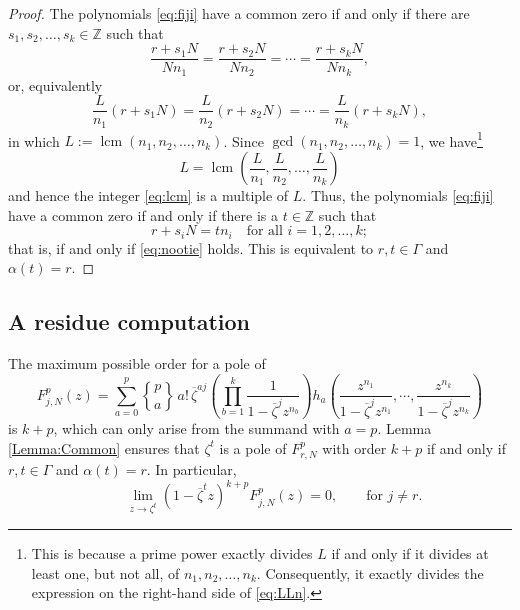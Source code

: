 \documentclass[10pt,reqno]{amsart}
\newcommand{\ZZ}{\mathbb{Z}}
\newcommand{\lcm}{\operatorname{lcm}}
\newcommand{\0}{\color{lightgray}0}
\newcommand{\stirling}[2]{\genfrac\{\}{0pt}{}{#1}{#2}}
\renewcommand\>{\rangle}
\newcommand\<{\langle}
\theoremstyle{plain}
\theoremstyle{definition}
\begin{document}
\begin{proof}
    The polynomials \eqref{eq:fiji} have a common zero if and only if there are $s_1,s_2,\ldots,s_k \in \ZZ$ such that 
    \begin{equation*}
        \frac{r+s_1N}{Nn_1} = \frac{r+s_2N}{Nn_2} = \cdots = \frac{r+s_kN}{Nn_k},
    \end{equation*}
    or, equivalently
    \begin{equation}\label{eq:lcm}
        \frac{L}{n_1}(r+s_1N) = \frac{L}{n_2}(r+s_2N) = \cdots = \frac{L}{n_k}(r+s_kN),
    \end{equation}
    in which $L:=\lcm(n_1,n_2,\ldots,n_k)$.  
    Since $\gcd(n_1,n_2,\ldots,n_k)=1$, we have\footnote{This is because a prime power exactly divides $L$ if and only if it divides at least one, but not all, of $n_1,n_2,\ldots,n_k$.
    Consequently, it exactly divides the expression on the right-hand side of \eqref{eq:LLn}.}%
    \begin{equation}\label{eq:LLn}
        L=\lcm \left( \frac{L}{n_1}, \frac{L}{n_2},\ldots,\frac{L}{n_k} \right)
    \end{equation}
    and hence the integer \eqref{eq:lcm} is a multiple of $L$.  Thus,
    the polynomials \eqref{eq:fiji} have a common zero if and only if
    there is a $t \in \ZZ$ such that 
    \begin{equation}\label{eq:eqn}
        r+s_iN=tn_i \quad \text{for all $i=1,2,\ldots,k$};
    \end{equation} 
    that is, if and only if \eqref{eq:nootie} holds.
    This is equivalent to $r,t \in \Gamma$ and $\alpha(t)=r$.
\end{proof}








\subsection{A residue computation}
The maximum possible order for a pole of 
\begin{equation*}
F^p_{j,N}(z) =
\sum_{a=0}^p \stirling{p}{a} \, a! \,\overline{\zeta}^{aj}
\left( \prod_{b=1}^k \frac{1}{1 - \overline{\zeta}^j z^{n_b}}  \right) h_a \left( \frac{z^{n_1}}{1 - \overline{\zeta}^j z^{n_1}}, \cdots, \frac{z^{n_k}}{1 - \overline{\zeta}^j z^{n_k}} \right)
\end{equation*}
is $k+p$, which can only arise from the summand with $a = p$.
Lemma \ref{Lemma:Common} ensures that $\zeta^t$ is a pole of $F^p_{r,N}$
with order $k+p$ if and only if $r,t \in \Gamma$ and $\alpha(t) = r$.  In particular,
\begin{equation}\label{eq:1zkmFmjz}\qquad
\lim_{z\to \zeta^t} (1-\overline{\zeta}^t z)^{k+p} F^p_{j,N}(z)  = 0,\qquad \text{for $j \neq r$}.
\end{equation}
\end{document}
